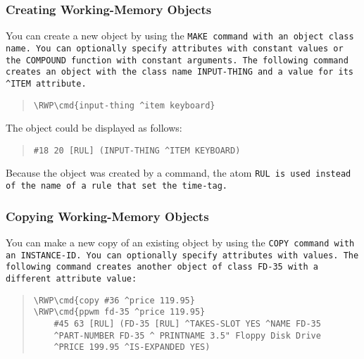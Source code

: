 \subsubsection{Creating Working-Memory Objects}

You can create a new object by using the \tt{MAKE} command with an
object class name. You can optionally specify attributes with constant
values or the \tt{COMPOUND} function with constant arguments. The
following command creates an object with the class name
\tt{INPUT-THING} and a value for its \verb|^ITEM| attribute.

\begin{quote}
\begin{Verbatim}[commandchars=\\\{\}]
\RWP\cmd{input-thing ^item keyboard}
\end{Verbatim}
\end{quote}

The object could be displayed as follows:

\begin{quote}
\begin{verbatim}
#18 20 [RUL] (INPUT-THING ^ITEM KEYBOARD)
\end{verbatim}
\end{quote}  

Because the object was created by a command, the atom \tt{RUL} is used
instead of the name of a rule that set the time-tag.

\subsubsection{Copying Working-Memory Objects}

You can make a new copy of an existing object by using the \tt{COPY}
command with an \tt{INSTANCE-ID}. You can optionally specify
attributes with values. The following command creates another object
of class \tt{FD-35} with a different attribute value:

\begin{quote}
\begin{Verbatim}[commandchars=\\\{\}]
\RWP\cmd{copy #36 ^price 119.95}
\RWP\cmd{ppwm fd-35 ^price 119.95}
    #45 63 [RUL] (FD-35 [RUL] ^TAKES-SLOT YES ^NAME FD-35
    ^PART-NUMBER FD-35 ^ PRINTNAME 3.5" Floppy Disk Drive
    ^PRICE 199.95 ^IS-EXPANDED YES)
\end{Verbatim}
\end{quote}

